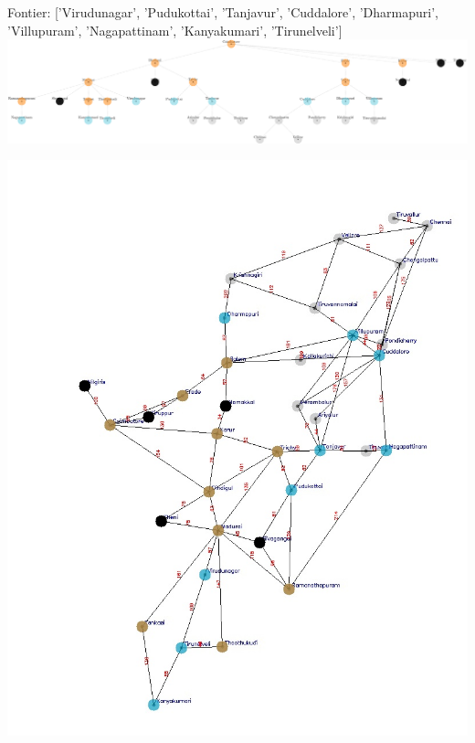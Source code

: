 \documentclass[xcolor=table]{beamer}
\begin{document}
\begin{frame}
  { \tiny Fontier: ['Virudunagar', 'Pudukottai', 'Tanjavur', 'Cuddalore', 'Dharmapuri', 'Villupuram', 'Nagapattinam', 'Kanyakumari', 'Tirunelveli']}
  \includegraphics[width=1\textwidth]{../BFSNodes/22-1.png}
  \begin{center}
    \includegraphics[height=0.55\textheight]{../BFSoutput/tamilBFS20.jpg}
  \end{center}
\end{frame}
\end{document}
